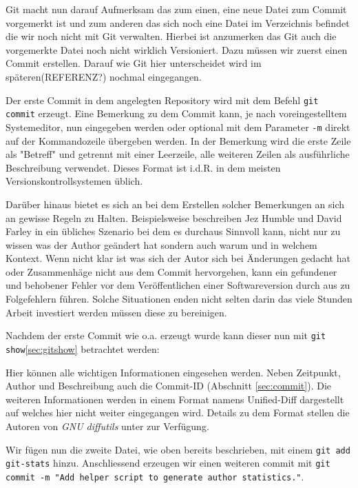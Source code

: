 Git macht nun darauf Aufmerksam das zum einen, eine neue Datei zum Commit
vorgemerkt ist und zum anderen das sich noch eine Datei im Verzeichnis befindet
die wir noch nicht mit Git verwalten. Hierbei ist anzumerken das Git auch die
vorgemerkte Datei noch nicht wirklich Versioniert. Dazu müssen wir zuerst einen
Commit erstellen. Darauf wie Git hier unterscheidet wird im späteren(REFERENZ?)
nochmal eingegangen.

Der erste Commit in dem angelegten Repository wird mit dem Befehl \texttt{git
commit} erzeugt. Eine Bemerkung zu dem Commit kann, je nach voreingestelltem
Systemeditor, nun eingegeben werden oder optional mit dem Parameter \texttt{-m}
direkt auf der Kommandozeile übergeben werden. In der Bemerkung wird die erste
Zeile als "Betreff" und getrennt mit einer Leerzeile, alle weiteren Zeilen als
ausführliche Beschreibung verwendet. Dieses Format ist i.d.R. in dem meisten
Versionskontrollsystemen üblich.

Darüber hinaus bietet es sich an bei dem Erstellen solcher Bemerkungen an sich
an gewisse Regeln zu Halten. Beispielsweise beschreiben Jez Humble und David
Farley in \cite[S.~37]{cd} ein übliches Szenario bei dem es durchaus Sinnvoll
kann, nicht nur zu wissen was der Author geändert hat sondern auch warum
und in welchem Kontext. Wenn nicht klar ist was sich der Autor sich bei
Änderungen gedacht hat oder Zusammenhäge nicht aus dem Commit hervorgehen, kann
ein gefundener und behobener Fehler vor dem Veröffentlichen einer
Softwareversion durch aus zu Folgefehlern führen. Solche Situationen enden
nicht selten darin das viele Stunden Arbeit investiert werden müssen diese zu
bereinigen.

Nachdem der erste Commit wie o.a. erzeugt wurde kann dieser nun mit \texttt{git
show}\ref{sec:gitshow} betrachtet werden:



Hier können alle wichtigen Informationen eingesehen werden. Neben Zeitpunkt,
Author und Beschreibung auch die Commit-ID (Abschnitt \ref{sec:commit}). Die
weiteren Informationen werden in einem Format namens Unified-Diff dargestellt
auf welches hier nicht weiter eingegangen wird. Details zu dem Format stellen
die Autoren von \textit{GNU diffutils} unter \cite[S.~12-13]{paper:diffutils}
zur Verfügung.

Wir fügen nun die zweite Datei, wie oben bereits beschrieben, mit einem
\texttt{git add git-stats} hinzu. Anschliessend erzeugen wir einen weiteren
\gls{commit} mit \texttt{git commit -m "Add helper script to generate author
statistics."}.

